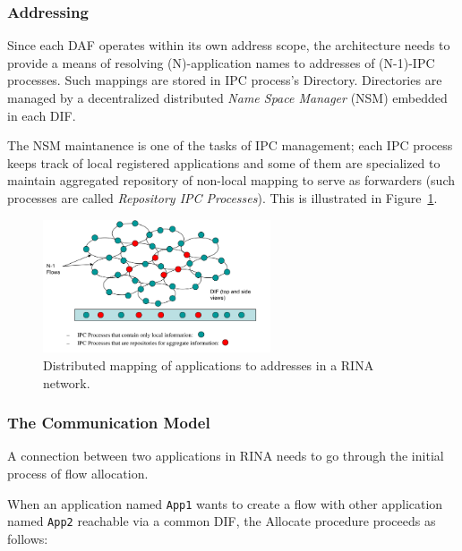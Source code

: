             \subsubsection{Addressing}

                Since each DAF operates within its own address scope, the architecture needs to provide a means of resolving (N)-application names to addresses of (N-1)-IPC processes. Such mappings are stored in IPC process's Directory. Directories are managed by a decentralized distributed \emph{Name Space Manager} (NSM) embedded in each DIF.

                The NSM maintanence is one of the tasks of IPC management; each IPC process keeps track of local registered applications and some of them are specialized to maintain aggregated repository of non-local mapping to serve as forwarders (such processes are called \emph{Repository IPC Processes}). This is illustrated in Figure~\ref{fig:rina_nsm}.

                \begin{figure}[H]
                    \begin{center}
                        \includegraphics[width=0.6\textwidth]{fig/archs_rina-nsm.png}
                      \caption{Distributed mapping of applications to addresses in a RINA network.}
                      \label{fig:rina_nsm}
                    \end{center}
                \end{figure}


            \subsubsection{The Communication Model}\label{archs:rina:communication}

                A connection between two applications in RINA needs to go through the initial process of flow allocation.

                When an application named \texttt{App1} wants to create a flow with other application named \texttt{App2} reachable via a common DIF, the Allocate procedure proceeds as follows:

